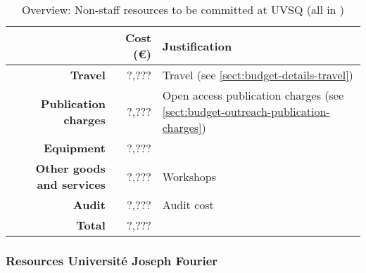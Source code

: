 \bigskip
\begin{table}[H]
\begin{tabular}{|r|r|p{9cm}|}
\hline
\textbf{} & \textbf{Cost (\euro)} & \textbf{Justification} \\\hline
\textbf{Travel} & ?,??? & Travel (see \ref{sect:budget-details-travel})\\\hline
\textbf{Publication charges} & ?,??? & Open access publication charges (see \ref{sect:budget-outreach-publication-charges})\\\hline
\textbf{Equipment} & ?,??? &  \\\hline    %

\textbf{Other goods and services} & ?,??? & Workshops \\\hline   %
\textbf{Audit} & ?,??? & Audit cost \\\hline
\textbf{Total} & ?,???\\\cline{1-2}
\end{tabular}
\caption{Overview: Non-staff resources to be committed at UVSQ (all in \texteuro)}\vspace*{-1em}
\end{table}





\subsubsection{Resources Universit\'{e} Joseph Fourier}


